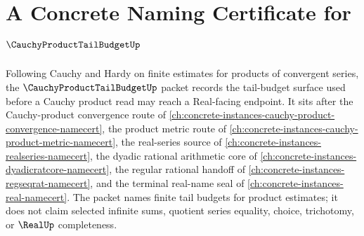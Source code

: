 \chapter{A Concrete Naming Certificate for $\CauchyProductTailBudgetUp$}
\label{ch:concrete-instances-cauchy-product-tail-budget-namecert}

Following Cauchy and Hardy on finite estimates for products of convergent series, the $\CauchyProductTailBudgetUp$ packet records the tail-budget surface used before a Cauchy product read may reach a Real-facing endpoint. It sits after the Cauchy-product convergence route of \autoref{ch:concrete-instances-cauchy-product-convergence-namecert}, the product metric route of \autoref{ch:concrete-instances-cauchy-product-metric-namecert}, the real-series source of \autoref{ch:concrete-instances-realseries-namecert}, the dyadic rational arithmetic core of \autoref{ch:concrete-instances-dyadicratcore-namecert}, the regular rational handoff of \autoref{ch:concrete-instances-regseqrat-namecert}, and the terminal real-name seal of \autoref{ch:concrete-instances-real-namecert}. The packet names finite tail budgets for product estimates; it does not claim selected infinite sums, quotient series equality, choice, trichotomy, or $\RealUp$ completeness.

